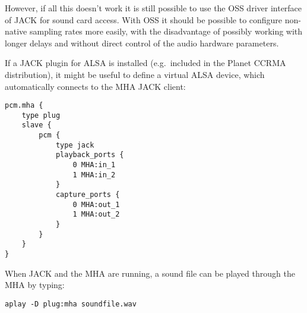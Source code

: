 However, if all this doesn't work it is still possible to use the OSS
driver interface of JACK for sound card access. With OSS it should be
possible to configure non-native sampling rates more easily, with the
disadvantage of possibly working with longer delays and without direct
control of the audio hardware parameters.

If a JACK plugin for ALSA is installed (e.g.\ included in the Planet
CCRMA distribution), it might be useful to define a virtual ALSA
device, which automatically connects to the MHA JACK client:
\begin{verbatim}
pcm.mha {
    type plug
    slave { 
        pcm {
            type jack
            playback_ports {
                0 MHA:in_1
                1 MHA:in_2
            }
            capture_ports {
                0 MHA:out_1
                1 MHA:out_2
            }
        }
    }
}
\end{verbatim}
When JACK and the MHA are running, a sound file can be played through
the MHA by typing:
\begin{verbatim}
aplay -D plug:mha soundfile.wav
\end{verbatim}

